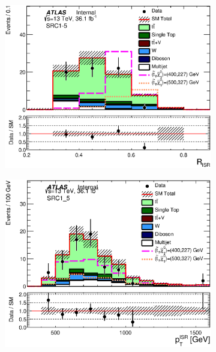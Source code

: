 \pagebreak

\begin{figure}[h!]
  \begin{center}
        \begin{subfigure}[b]{0.40\textwidth}    
    	 \includegraphics[width=\textwidth]{figures/SRC/CA_RISR_SRC1_5}
                \caption{ }
    \end{subfigure}
        \begin{subfigure}[b]{0.40\textwidth}    
    	 \includegraphics[width=\textwidth]{figures/plotRegion/CA_PTISR_SRC1_5.eps}
                \caption{ }
    \end{subfigure}

\end{center}
\end{figure}
